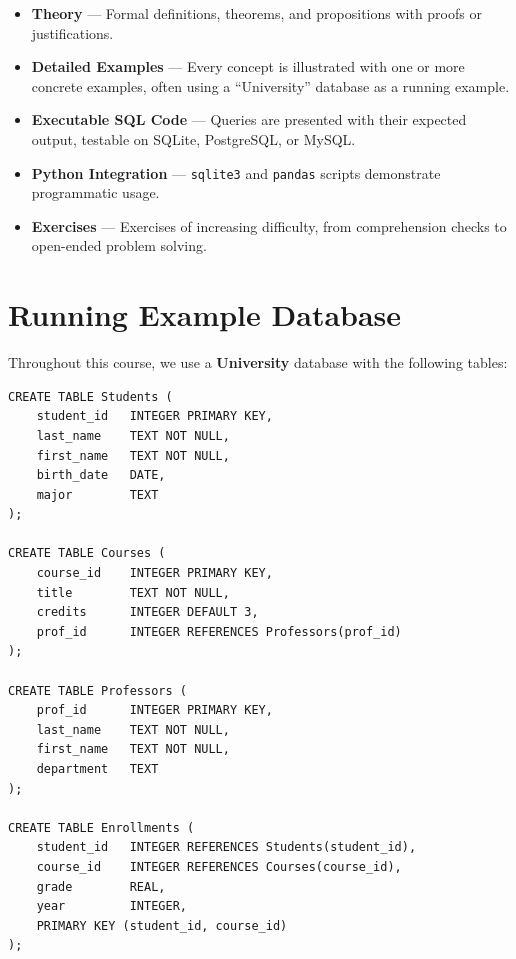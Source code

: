 \begin{itemize}
    \item \textbf{Theory} --- Formal definitions, theorems, and propositions
          with proofs or justifications.
    \item \textbf{Detailed Examples} --- Every concept is illustrated with one
          or more concrete examples, often using a ``University'' database
          as a running example.
    \item \textbf{Executable SQL Code} --- Queries are presented with their
          expected output, testable on SQLite, PostgreSQL, or MySQL.
    \item \textbf{Python Integration} --- \texttt{sqlite3} and \texttt{pandas}
          scripts demonstrate programmatic usage.
    \item \textbf{Exercises} --- Exercises of increasing difficulty, from
          comprehension checks to open-ended problem solving.
\end{itemize}

\section*{Running Example Database}

Throughout this course, we use a \textbf{University} database with the
following tables:

\begin{codeblock}[title=\textbf{University Database Schema}]
\begin{verbatim}
CREATE TABLE Students (
    student_id   INTEGER PRIMARY KEY,
    last_name    TEXT NOT NULL,
    first_name   TEXT NOT NULL,
    birth_date   DATE,
    major        TEXT
);

CREATE TABLE Courses (
    course_id    INTEGER PRIMARY KEY,
    title        TEXT NOT NULL,
    credits      INTEGER DEFAULT 3,
    prof_id      INTEGER REFERENCES Professors(prof_id)
);

CREATE TABLE Professors (
    prof_id      INTEGER PRIMARY KEY,
    last_name    TEXT NOT NULL,
    first_name   TEXT NOT NULL,
    department   TEXT
);

CREATE TABLE Enrollments (
    student_id   INTEGER REFERENCES Students(student_id),
    course_id    INTEGER REFERENCES Courses(course_id),
    grade        REAL,
    year         INTEGER,
    PRIMARY KEY (student_id, course_id)
);
\end{verbatim}
\end{codeblock}

